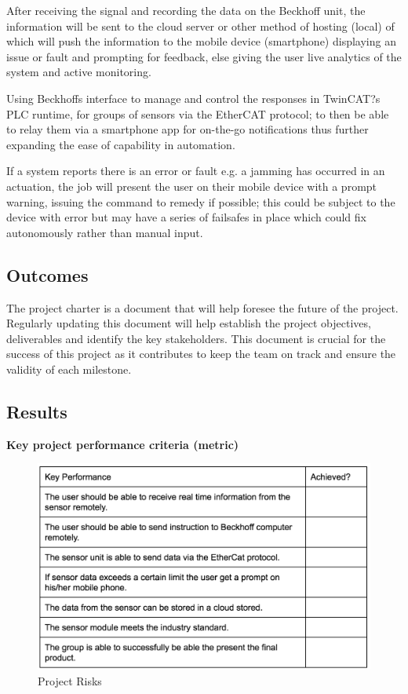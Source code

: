 \documentclass[a4paper, 10pt, conference]{IEEEconf}
\begin{document}
After receiving the signal and recording the data on the Beckhoff unit, the information will be sent to the cloud server or other method of hosting (local) of which will push the information to the mobile device (smartphone) displaying an issue or fault and prompting for feedback, else giving the user live analytics of the system and active monitoring.

Using Beckhoffs interface to manage and control the responses in TwinCAT?s PLC runtime, for groups of sensors via the EtherCAT protocol; to then be able to relay them via a smartphone app for on-the-go notifications thus further expanding the ease of capability in automation.

If a system reports there is an error or fault e.g. a jamming has occurred in an actuation, the job will present the user on their mobile device with a prompt warning, issuing the command to remedy if possible; this could be subject to the device with error but may have a series of failsafes in place which could fix autonomously rather than manual input.

\subsection{Outcomes}


The project charter is a document that will help foresee the future of the project. Regularly updating this document will help establish the project objectives, deliverables and identify the key stakeholders. This document is crucial for the success of this project as it contributes to keep the team on track and ensure the validity of each milestone. 

\subsection{Results}
{\bf Key project performance criteria (metric)}

\begin{figure}[h!]
  \includegraphics[width=\linewidth]{images/Preformance}
  \caption{Project Risks}
  \label{fig:ProjectRisks}
\end{figure}
\end{document}
